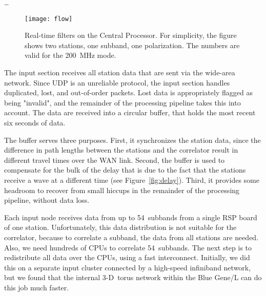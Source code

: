 \documentclass[journal]{IEEEtran}
\begin{document}
\ldots

\begin{figure*}
\texttt{[image: flow]}
\caption{Real-time filters on the Central Processor.  For simplicity, the
figure shows two stations, one subband, one polarization.  The numbers are
valid for the 200~MHz mode.}
\label{fig:flow}
\end{figure*}


The input section receives all station data that are sent via the wide-area
network.
Since UDP is an unreliable protocol, the input section handles duplicated,
lost, and out-of-order packets.
Lost data is appropriately flagged as being "invalid", and the remainder
of the processing pipeline takes this into account.
The data are received into a circular buffer, that holds the most recent
six seconds of data.

The buffer serves three purposes.
First, it synchronizes the station data, since the difference in path lengths
between the stations and the correlator result in different travel times over
the WAN link.
Second, the buffer is used to compensate for the bulk of the delay that
is due to the fact that the stations receive a wave at a different time
(see Figure~\ref{fig:delay}).
Third, it provides some headroom to recover from small hiccups in the remainder
of the processing pipeline, without data loss.

Each input node receives data from up to 54~subbands from a single RSP board
of one station.
Unfortunately, this data distribution is not suitable for the correlator,
because to correlate a subband, the data from all stations are needed.
Also, we need hundreds of CPUs to correlate 54~subbands.
The next step is to redistribute all data over the CPUs, using a fast
interconnect.
Initially, we did this on a separate input cluster connected by a high-speed
infiniband network, but we found that the internal 3-D~torus network within
the Blue Gene/L can do this job much faster.
\end{document}
